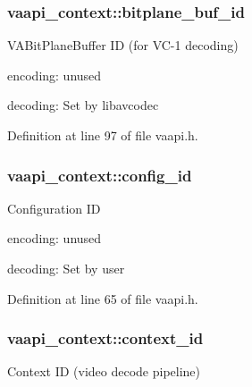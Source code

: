 \subsubsection[{\texorpdfstring{bitplane\+\_\+buf\+\_\+id}{bitplane_buf_id}}]{ vaapi\+\_\+context\+::bitplane\+\_\+buf\+\_\+id}\hypertarget{structvaapi__context_a94c78d1c8fffa43a4d816b1a5182e31c}{}\label{structvaapi__context_a94c78d1c8fffa43a4d816b1a5182e31c}
V\+A\+Bit\+Plane\+Buffer ID (for V\+C-\/1 decoding)


\begin{DoxyItemize}
\item encoding\+: unused
\item decoding\+: Set by libavcodec 
\end{DoxyItemize}

Definition at line 97 of file vaapi.\+h.

\subsubsection[{\texorpdfstring{config\+\_\+id}{config_id}}]{ vaapi\+\_\+context\+::config\+\_\+id}\hypertarget{structvaapi__context_a8523abca4746125bb1458a13bee1a1bd}{}\label{structvaapi__context_a8523abca4746125bb1458a13bee1a1bd}
Configuration ID


\begin{DoxyItemize}
\item encoding\+: unused
\item decoding\+: Set by user 
\end{DoxyItemize}

Definition at line 65 of file vaapi.\+h.

\subsubsection[{\texorpdfstring{context\+\_\+id}{context_id}}]{ vaapi\+\_\+context\+::context\+\_\+id}\hypertarget{structvaapi__context_a2574735bdd4c51910ce627a6f1ec0b63}{}\label{structvaapi__context_a2574735bdd4c51910ce627a6f1ec0b63}
Context ID (video decode pipeline)


